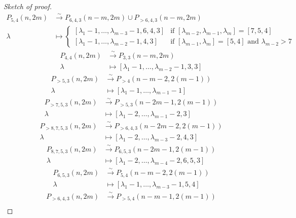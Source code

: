 \documentclass[12pt, reqno]{amsart}
\theoremstyle{remark}
\begin{document}
\begin{proof}[Sketch of proof]
\begin{align*}
    P_{5, 4}(n, 2m) &\xrightarrow{\sim} P_{6, 4, 3}(n - m, 2m) \cup P_{>6, 4, 3}(n - m, 2m) \\
    \lambda &\mapsto
              \begin{cases}
                [\lambda_1 - 1, \dots, \lambda_{m - 3} - 1, 6, 4, 3] &\text{if }[\lambda_{m - 2}, \lambda_{m - 1}, \lambda_m] = [7, 5, 4] \\
                [\lambda_1 - 1, \dots, \lambda_{m - 2} - 1, 4, 3] &\text{if }[\lambda_{m - 1}, \lambda_m] = [5, 4]\text{ and }\lambda_{m - 2} > 7
              \end{cases}
  \end{align*}
  \begin{align*}
    P_{4, 4}(n, 2m) &\xrightarrow{\sim} P_{3, 3}(n - m, 2m) \\
    \lambda &\mapsto [\lambda_1 - 1, \dots, \lambda_{m - 2} - 1, 3, 3]
  \end{align*}
  \begin{align*}
    P_{>5, 3}(n, 2m) &\xrightarrow{\sim} P_{>4}(n - m - 2, 2(m - 1)) \\
    \lambda &\mapsto [\lambda_1 - 1, \dots, \lambda_{m - 1} - 1]
  \end{align*}
  \begin{align*}
    P_{>7, 5, 3}(n, 2m) &\xrightarrow{\sim} P_{>5, 3}(n - 2m - 1, 2(m - 1)) \\
    \lambda &\mapsto [\lambda_1 - 2, \dots, \lambda_{m - 1} - 2, 3]
  \end{align*}
  \begin{align*}
    P_{>8, 7, 5, 3}(n, 2m) &\xrightarrow{\sim} P_{>6, 4, 3}(n - 2m - 2, 2(m - 1)) \\
    \lambda &\mapsto [\lambda_1 - 2, \dots, \lambda_{m - 3} - 2, 4, 3]
  \end{align*}
  \begin{align*}
    P_{8, 7, 5, 3}(n, 2m) &\xrightarrow{\sim} P_{6, 5, 3}(n - 2m - 1, 2(m - 1)) \\
    \lambda &\mapsto [\lambda_1 - 2, \dots, \lambda_{m - 4} - 2, 6, 5, 3]
  \end{align*}
  \begin{align*}
    P_{6, 5, 3}(n, 2m) &\xrightarrow{\sim} P_{5, 4}(n - m - 2, 2(m - 1)) \\
    \lambda &\mapsto [\lambda_1 - 1, \dots, \lambda_{m - 3} - 1, 5, 4]
  \end{align*}
  \begin{align*}
    P_{>6, 4, 3}(n, 2m) &\xrightarrow{\sim} P_{>5, 4}(n - m - 1, 2(m - 1)) \\

\end{align*}
\end{proof}
\end{document}
